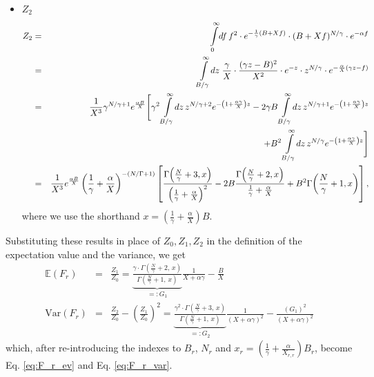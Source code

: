 \documentclass[letter,10pt,oneside]{article}
\newcommand{\ba}{\begin{eqnarray*}}
\newcommand{\ea}{\end{eqnarray*}}
\newcommand{\+}{^\dagger}
\newcommand{\refeq}[1]{Eq. \ref{#1}}
\begin{document}
\begin{appendix}
\begin{itemize}
  \item $Z_2$
  \ba
    Z_2 &=& \intop_0^\infty \! df \, f^2\cdot e^{-\frac{1}{\gamma}(B + Xf)} \cdot (B + Xf)^{N/\gamma} \cdot e^{-\alpha f}
    \\
    &=& 
    \intop_{B/\gamma}^\infty \! dz\; \frac{\gamma}{X} \cdot \frac{(\gamma z - B)^2}{X^2}\cdot e^{-z}\cdot z^{N/\gamma} \cdot e^{-\frac{\alpha}{X}(\gamma z - f)}
    \\
    &=& \frac{1}{X^3}\gamma^{N/\gamma + 1} e^\frac{\alpha B}{X}
    \Bigg[
      \gamma^2 
        \intop_{B/\gamma}^\infty\!dz\, z^{N/\gamma + 2} e^{-\left(1 + \frac{\alpha\gamma}{X}\right)z}
      - 2\gamma B
        \intop_{B/\gamma}^\infty\!dz\, z^{N/\gamma + 1} e^{-\left(1 + \frac{\alpha\gamma}{X}\right)z} 
        \\
        &&\hspace{2.7cm}
      + B^2 
        \intop_{B/\gamma}^\infty\!dz\, z^{N/\gamma} e^{-\left(1 + \frac{\alpha\gamma}{X}\right)z}
    \Bigg]
    \\
    &=& 
    \frac{1}{X^3}e^\frac{\alpha B}{X} \left(\frac{1}{\gamma} + \frac{\alpha}{X}\right)^{-(N/\Gamma + 1)}\left[\frac{\Gamma\!\left(\frac{N}{\gamma} + 3, x\right)}{\left(\frac{1}{\gamma} + \frac{\alpha}{X}\right)^2} -2B \frac{\Gamma\!\left(\frac{N}{\gamma} + 2, x\right)}{\frac{1}{\gamma} + \frac{\alpha}{X}} + B^2 \Gamma\!\left(\frac{N}{\gamma} + 1, x\right)\right],
  \ea
  where we use the shorthand $x = \left(\frac{1}{\gamma} + \frac{\alpha}{X}\right)B$.
\end{itemize}
Substituting these results in place of $Z_0, Z_1, Z_2$ in the definition of the expectation value and the variance, we get
\ba
  \mathbb{E}(F_r) &=& \frac{Z_1}{Z_0} = \underbrace{\frac{\gamma\cdot\Gamma\!\left(\frac{N}{\gamma}+2,\,x\right)}{\Gamma\!\left(\frac{N}{\gamma}+1,\,x\right)}}_{=:G_1}\frac{1}{X + \alpha \gamma} - \frac{B}{X}
  \\
  \text{Var}(F_r) &=& \frac{Z_2}{Z_0} - \left(\frac{Z_1}{Z_0}\right)^2 = \underbrace{\frac{\gamma^2\cdot\Gamma\!\left(\frac{N}{\gamma}+3,\,x\right)}{\Gamma\!\left(\frac{N}{\gamma}+1,\,x\right)}}_{=:G_2}\frac{1}{(X + \alpha \gamma)^2} - \frac{(G_1)^2}{(X + \alpha\gamma)^2}
\ea
which, after re-introducing the indexes to $B_r$, $N_r$ and $x_r = \left(\frac{1}{\gamma} + \frac{\alpha}{X_{r,r}}\right)\!B_r$, become \refeq{eq:F_r_ev} and \refeq{eq:F_r_var}.
\end{appendix}
\end{document}
